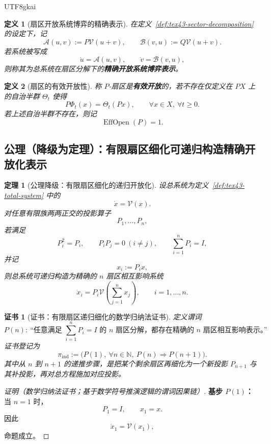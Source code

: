 \documentclass[12pt]{article}
\newtheorem{definition}{定义}[section]
\newtheorem{theorem}{定理}[section]
\newtheorem{Certificate}{证书}[section]
\newcommand{\NN}{\mathbb{N}}
\newcommand{\EffOpen}{\operatorname{EffOpen}}
\begin{document}
\begin{CJK*}{UTF8}{gkai}
\begin{definition}[扇区开放系统博弈的精确表示]
\label{def:tex43-exact-openization}
在定义~\ref{def:tex43-sector-decomposition} 的设定下，记
\[
  \mathcal A(u,v):=P\mathcal V(u+v),
  \qquad
  \mathcal B(v,u):=Q\mathcal V(u+v).
\]
若系统被写成
\[
  \dot u=\mathcal A(u,v),
  \qquad
  \dot v=\mathcal B(v,u),
\]
则称其为总系统在扇区分解下的\textbf{精确开放系统博弈表示}。
\end{definition}

\begin{definition}[扇区的有效开放性]
\label{def:tex43-effective-openness}
称 $P$-扇区是\textbf{有效开放}的，若不存在仅定义在 $PX$ 上的自治半群 $\Theta_t$ 使得
\[
  P\Phi_t(x)=\Theta_t(Px),
  \qquad
  \forall x\in X,\ \forall t\ge 0.
\]
若上述自治半群不存在，则记
\[
  \EffOpen(P)=1.
\]
\end{definition}

\subsection{公理（降级为定理）：有限扇区细化可递归构造精确开放化表示}
\label{subsec:tex43-ch3-axiom-downgrade}

\begin{theorem}[公理降级：有限扇区细化的递归开放化]
\label{thm:tex43-finite-sector-refinement}
设总系统为定义~\ref{def:tex43-total-system} 中的
\[
  \dot x=\mathcal V(x).
\]
对任意有限族两两正交的投影算子
\[
  P_1,\dots,P_n,
\]
若满足
\[
  P_i^2=P_i,
  \qquad
  P_iP_j=0\ (i\neq j),
  \qquad
  \sum_{i=1}^{n}P_i=I,
\]
并记
\[
  x_i:=P_i x,
\]
则总系统可递归构造为精确的 $n$ 扇区相互影响系统
\[
  \dot x_i
  =
  P_i\mathcal V\!\left(\sum_{j=1}^{n}x_j\right),
  \qquad
  i=1,\dots,n.
\]
\end{theorem}

\begin{Certificate}[证书：有限扇区递归细化的数学归纳法证书]
\label{cert:tex43-finite-sector-refinement}
定义谓词
\[
  P(n):
  \ \text{“任意满足 } \sum_{i=1}^{n}P_i=I \text{ 的 }n\text{ 扇区分解，都存在精确的 }n\text{ 扇区相互影响表示。”}
\]
证书登记为
\[
  \pi_{\mathrm{ind}}
  :=
  \bigl(P(1),\ \forall n\in\NN,\ P(n)\Rightarrow P(n+1)\bigr).
\]
其中从 $n$ 到 $n+1$ 的递推步骤，是把某个剩余扇区再细化为一个新投影 $P_{n+1}$ 与其补投影，再对总方程施加对应投影。
\end{Certificate}

\begin{proof}[证明（数学归纳法证书；基于数学符号推演逻辑的谓词因果链）]
\textbf{基步 $P(1)$：}
当 $n=1$ 时，
\[
  P_1=I,
  \qquad
  x_1=x.
\]
因此
\[
  \dot x_1=\mathcal V(x_1),
\]
命题成立。


\end{proof}
\end{CJK*}
\end{document}
